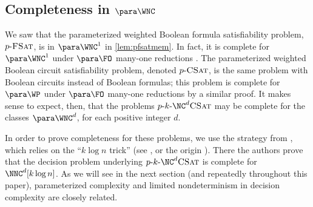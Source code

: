 \subsection{Completeness in \texorpdfstring{$\para \WNC$}{paraWNC}}

We saw that the parameterized weighted Boolean formula satisfiability problem, $p \textnormal{-} \textsc{FSat}$, is in $\para \WNC^1$ in \autoref{lem:pfsatmem}.
In fact, it is complete for $\para \WNC^1$ under $\para \FO$ many-one reductions \autocite[Theorem~3.6]{est15}.
The parameterized weighted Boolean circuit satisfiability problem, denoted $p \textnormal{-} \textsc{CSat}$, is the same problem with Boolean circuits instead of Boolean formulas; this problem is complete for $\para \WP$ under $\para \FO$ many-one reductions by a similar proof.
It makes sense to expect, then, that the problems $\pNCSAT$ may be complete for the classes $\para \WNC^d$, for each positive integer $d$.

In order to prove completeness for these problems, we use the strategy from \autocite[Theorem~3.6]{cc97lim}, which relies on the ``$k \log n$ trick'' (see \autocite[Corollary~3.13]{fg06}, or the origin \autocite{adf95}).
There the authors prove that the decision problem underlying $\pNCSAT$ is complete for $\NNC^d[k \log n]$.
As we will see in the next section (and repeatedly throughout this paper), parameterized complexity and limited nondeterminism in decision complexity are closely related.


